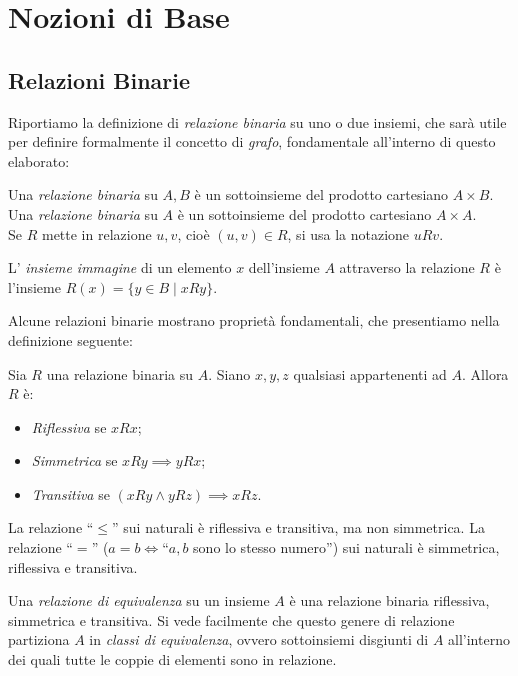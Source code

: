 \section{Nozioni di Base}
\label{sec:base}

\subsection{Relazioni Binarie}
Riportiamo la definizione di \emph{relazione binaria} su uno o due insiemi, che sarà utile per definire formalmente il concetto di \emph{grafo}, fondamentale all'interno di questo elaborato:
\begin{definition}
    Una \emph{relazione binaria} su $A,B$ è un sottoinsieme del prodotto cartesiano $A \times B$.\\
    Una \emph{relazione binaria} su $A$ è un sottoinsieme del prodotto cartesiano $A \times A$.\\
	Se $R$ mette in relazione $u,v$, cioè $(u,v) \in R$, si usa la notazione $u R v$.
\end{definition}
\begin{definition}
    L' \emph{insieme immagine} di un elemento $x$ dell'insieme $A$ attraverso la relazione $R$ è l'insieme $R(x) = \{y \in B \mid x R y\}$.
\end{definition}
Alcune relazioni binarie mostrano proprietà fondamentali, che presentiamo nella definizione seguente:
\begin{definition}
    Sia $R$ una relazione binaria su $A$. Siano $x,y,z$ qualsiasi appartenenti ad $A$. Allora $R$ è:
    \begin{itemize}
        \item \emph{Riflessiva} se $x R x$;
        \item \emph{Simmetrica} se $x R y \implies y R x$;
        \item \emph{Transitiva} se $(x R y \land y R z) \implies x R z$.
    \end{itemize}
\end{definition}
\begin{example}
    La relazione ``$\leq$'' sui naturali è riflessiva e transitiva, ma non simmetrica. La relazione ``$=$'' ($a = b \iff $``$a,b$ sono lo stesso numero'') sui naturali è simmetrica, riflessiva e transitiva.
\end{example}
\begin{definition}
    Una \emph{relazione di equivalenza} su un insieme $A$ è una relazione binaria riflessiva, simmetrica e transitiva. Si vede facilmente che questo genere di relazione partiziona $A$ in \emph{classi di equivalenza}, ovvero sottoinsiemi disgiunti di $A$ all'interno dei quali tutte le coppie di elementi sono in relazione.
\end{definition}
